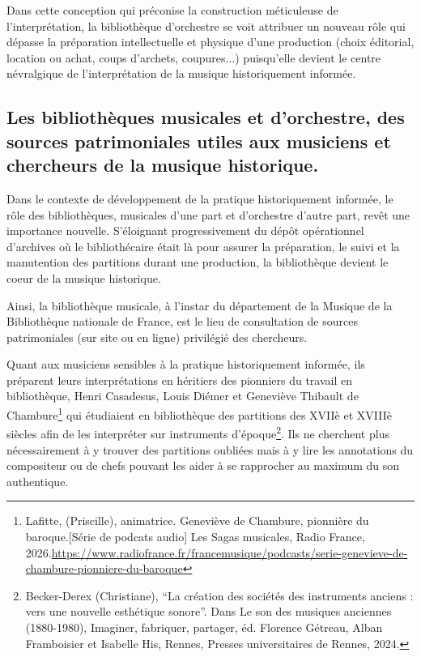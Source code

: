 Dans cette conception qui préconise la construction méticuleuse de l'interprétation, la bibliothèque d'orchestre se voit attribuer un nouveau rôle qui dépasse la préparation intellectuelle et physique d'une production (choix éditorial, location ou achat, coups d'archets, coupures...) puisqu'elle devient le centre névralgique de l'interprétation de la musique historiquement informée. 


\subsection*{Les bibliothèques musicales et d'orchestre, des sources patrimoniales utiles aux musiciens et chercheurs de la musique historique.}

Dans le contexte de développement de la pratique historiquement informée, le rôle des bibliothèques, musicales d'une part et d'orchestre d'autre part, revêt une importance nouvelle. 
S'éloignant progressivement du dépôt opérationnel d'archives où le bibliothécaire était là pour assurer la préparation, le suivi et la manutention des partitions durant une production, la bibliothèque devient le coeur de la musique historique. 

Ainsi, la bibliothèque musicale, à l'instar du département de la Musique de la Bibliothèque nationale de France, est le lieu de consultation de sources patrimoniales (sur site ou en ligne) privilégié des chercheurs.

Quant aux musiciens sensibles à la pratique historiquement informée, ils préparent leurs interprétations en héritiers des pionniers du travail en bibliothèque, Henri Casadesus, Louis Diémer et Geneviève Thibault de Chambure\footnote{Lafitte, (Priscille), animatrice. Geneviève de Chambure, pionnière du baroque.[Série de podcats audio] Les Sagas musicales, Radio France, 2026.\url{https://www.radiofrance.fr/francemusique/podcasts/serie-genevieve-de-chambure-pionniere-du-baroque}} qui étudiaient en bibliothèque des partitions des XVIIè et XVIIIè siècles afin de les interpréter sur instruments d'époque\footnote{Becker-Derex (Christiane), \enquote{La création des sociétés des instruments anciens : vers une nouvelle esthétique sonore}. Dans Le son des musiques anciennes (1880-1980), Imaginer, fabriquer, partager, éd. Florence Gétreau, Alban Framboisier et Isabelle His, Rennes, Presses universitaires de Rennes, 2024.}. Ils ne cherchent plus nécessairement à y trouver des partitions oubliées mais à y lire les annotations du compositeur ou de chefs pouvant les aider à se rapprocher au maximum du son authentique.

